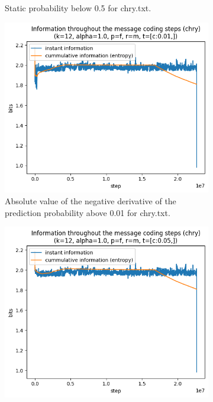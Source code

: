\documentclass{article}
\begin{document}
\begin{figure}
\begin{subfigure}[b]{0.3\textwidth}
\begin{center}
        \end{center}
        \caption{Static probability below 0.5 for chry.txt.}
        \label{fig:results-threshold-n-0.5}
    \end{subfigure}
    \begin{subfigure}[b]{0.3\textwidth}
        \begin{center}
            \includegraphics[width=1.0\linewidth]{../scripts/images/chry_12_1.0_f_m_[c:0.01,].png}
        \end{center}
        \caption{Absolute value of the negative derivative of the prediction probability above 0.01 for chry.txt.}
        \label{fig:results-threshold-c-0.01}
    \end{subfigure}
    \hfill
    \begin{subfigure}[b]{0.3\textwidth}
        \begin{center}
            \includegraphics[width=1.0\linewidth]{../scripts/images/chry_12_1.0_f_m_[c:0.05,].png}

\end{center}
\end{subfigure}
\end{figure}
\end{document}
